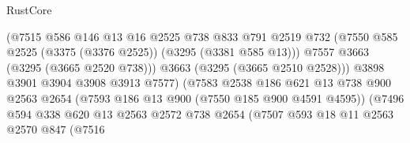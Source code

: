 \begin{lexlean}{RustCore}
\begin{coremodule}
                                        (@7515
                                          @586
                                          @146
                                          @13
                                          @16
                                          @2525
                                          @738
                                          @833
                                          @791
                                          @2519
                                          @732
                                          (@7550
                                            @585
                                            @2525
                                            (@3375 (@3376 @2525))
                                            (@3295 (@3381 @585 @13)))
                                          @7557
                                          @3663
                                          (@3295 (@3665 @2520 @738)))
                                        @3663
                                        (@3295 (@3665 @2510 @2528)))
                                      @3898
                                      @3901
                                      @3904
                                      @3908
                                      @3913
                                      @7577)
                                    (@7583
                                      @2538
                                      @186
                                      @621
                                      @13
                                      @738
                                      @900
                                      @2563
                                      @2654
                                      (@7593 @186 @13 @900 (@7550 @185 @900 @4591 @4595))
                                      (@7496
                                        @594
                                        @338
                                        @620
                                        @13
                                        @2563
                                        @2572
                                        @738
                                        @2654
                                        (@7507
                                          @593
                                          @18
                                          @11
                                          @2563
                                          @2570
                                          @847
                                          (@7516

\end{coremodule}
\end{lexlean}
